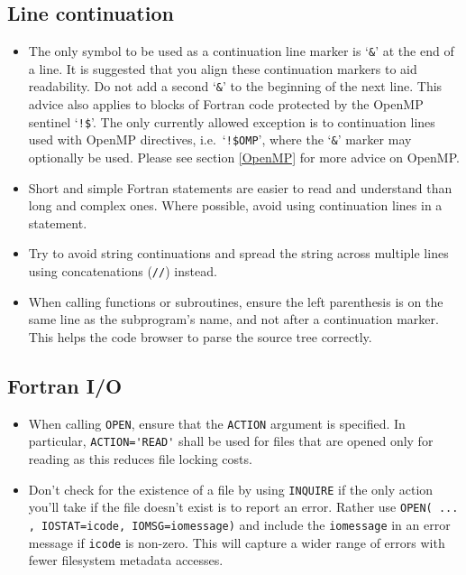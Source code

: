 \subsection{Line continuation}\label{sec:contd}
\begin{itemize}
\item The only symbol to be used as a continuation line marker is `\verb|&|' at
 the end of a line. It is suggested that you align these continuation markers
 to aid readability.  Do not add a second `\verb|&|' to the beginning of the
 next line. This advice also applies to blocks of Fortran code protected by the
 OpenMP sentinel `\verb|!$|'. The only currently allowed exception is to
 continuation lines used with OpenMP directives, i.e.\ `\verb|!$OMP|', where the
 `\verb|&|' marker may optionally be used.
 Please see section \ref{OpenMP} for more advice on OpenMP.

\item Short and simple Fortran statements are easier to read
and understand than long and complex ones.
Where possible, avoid using continuation lines in a statement.
\item Try to avoid string continuations and spread the string across multiple lines using concatenations (\verb|//|) instead.

\item When calling functions or subroutines, ensure the left parenthesis is on
the same line as the subprogram's name, and not after a continuation marker.
This helps the code browser to parse the source tree correctly.
\end{itemize}

\subsection{Fortran I/O}\label{sec:fortio}
\begin{itemize}
  \item When calling \verb|OPEN|, ensure that the \verb|ACTION| argument is specified. In particular, \verb|ACTION='READ'|
        shall be used for files that are opened only for reading as this reduces file locking costs.
  \item Don't check for the existence of a file by using \verb|INQUIRE| if the only action you'll take if the file doesn't
        exist is to report an error. Rather use \verb|OPEN( ... , IOSTAT=icode, IOMSG=iomessage)| and include the
        \verb|iomessage| in an error message if \verb|icode| is non-zero. This will capture a wider range of errors with
        fewer filesystem metadata accesses.
\end{itemize}


